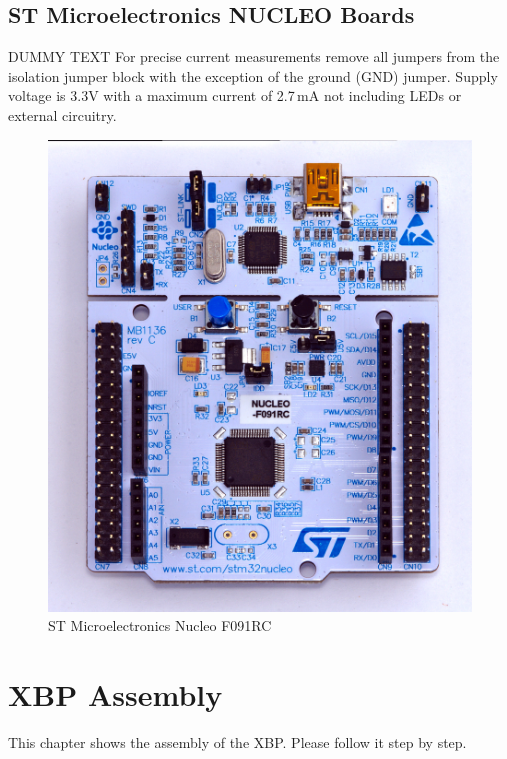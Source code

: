 \documentclass[twoside,11pt]{cergdoc}
\begin{document}
\section{ST Microelectronics NUCLEO Boards}

DUMMY TEXT For precise current measurements remove all jumpers from the isolation jumper block 
with the exception of the ground (GND) jumper. Supply voltage is 3.3V with a maximum 
current of 2.7\,mA not including LEDs or external circuitry.

\begin{figure}[ht]
  \begin{center}
    \includegraphics[scale=0.6]{figures/nucleo-f091rc}
    \caption{ST Microelectronics Nucleo F091RC}\label{fig:f091rc}
  \end{center}
\vspace{-1ex}
\end{figure}


\chapter{XBP Assembly}
This chapter shows the assembly of the XBP. Please follow it step by step. 
\end{document}
